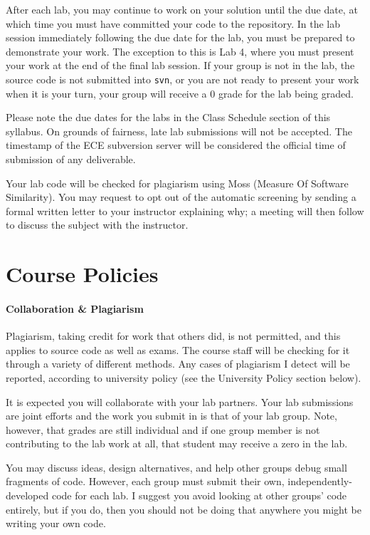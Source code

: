 \documentclass[letterpaper,10pt]{article}
\begin{document}
After each lab, you may continue to work on your solution until the due date, at which time you must have committed your code to the repository. In the lab session immediately following the due date for the lab, you must be prepared to demonstrate your work. The exception to this is Lab 4, where you must present your work at the end of the final lab session.  If your group is not in the lab, the source code is not submitted into \texttt{svn}, or you are not ready to present your work when it is your turn, your group will receive a 0 grade for the lab being graded.

Please note the due dates for the labs in the Class Schedule section of this syllabus. On grounds of fairness, late lab submissions will not be accepted. The timestamp of the ECE subversion server will be considered the official time of submission of any deliverable.

Your lab code will be checked for plagiarism using Moss (Measure Of Software Similarity). You may request to opt out of the automatic screening by sending a formal written letter to your instructor explaining why; a meeting will then follow to discuss the subject with the instructor.

\section*{Course Policies}

\paragraph{Collaboration \& Plagiarism}

Plagiarism, taking credit for work that others did, is not permitted, and this applies to source code as well as exams. The course staff will be checking for it through a variety of different methods. Any cases of plagiarism I detect will be reported, according to university policy (see the University Policy section below).

It is expected you will collaborate with your lab partners. Your lab submissions are joint efforts and the work you submit in is that of your lab group. Note, however, that grades are still individual and if one group member is not contributing to the lab work at all, that student may receive a zero in the lab.

You may discuss ideas, design alternatives, and help other groups debug small fragments of code. However, each group must submit their own, independently-developed code for each lab. I suggest you avoid looking at other groups' code entirely, but if you do, then you should not be doing that anywhere you might be writing your own code.
\end{document}
